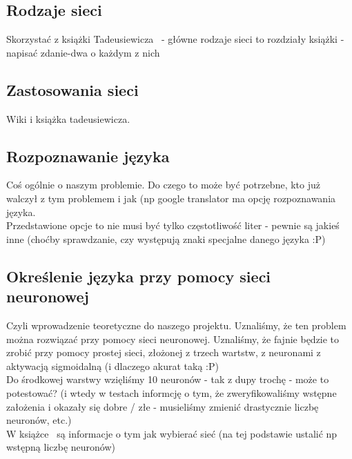 \documentclass[journal]{IEEEtran}
\begin{document}

\subsection{Rodzaje sieci}
Skorzystać z książki Tadeusiewicza~\cite{tad:sieci} - główne rodzaje sieci to rozdziały książki - napisać
zdanie-dwa o każdym z nich


\subsection{Zastosowania sieci}
Wiki i książka tadeusiewicza.


\subsection{Rozpoznawanie języka}
Coś ogólnie o naszym problemie. Do czego to może być potrzebne, kto już walczył z tym problemem i jak
(np google translator ma opcję rozpoznawania języka. \\
Przedstawione opcje to nie musi być tylko częstotliwość liter - pewnie są jakieś inne (choćby sprawdzanie,
czy występują znaki specjalne danego języka :P)


\subsection{Określenie języka przy pomocy sieci neuronowej}
Czyli wprowadzenie teoretyczne do naszego projektu. Uznaliśmy, że ten problem można rozwiązać przy pomocy sieci
neuronowej. Uznaliśmy, że fajnie będzie to zrobić przy pomocy prostej sieci, złożonej z trzech wartstw,
z neuronami z aktywacją sigmoidalną (i dlaczego akurat taką :P)\\
Do środkowej warstwy wzięliśmy 10 neuronów - tak z dupy trochę - może to potestować? (i wtedy w testach
informcję o tym, że zweryfikowaliśmy wstępne założenia i okazały się dobre / złe - musieliśmy zmienić
drastycznie liczbę neuronów, etc.)\\
W książce~\cite{tad:elem_wpr} są informacje o tym jak wybierać sieć (na tej podstawie ustalić np wstępną liczbę
neuronów)
\end{document}
